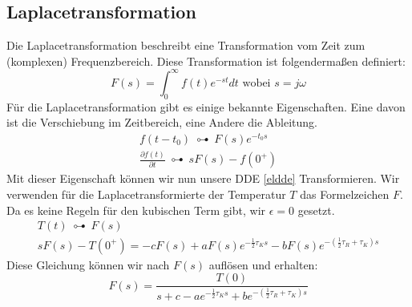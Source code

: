 \subsection{Laplacetransformation}
Die Laplacetransformation beschreibt eine Transformation vom Zeit zum (komplexen) Frequenzbereich.
Diese Transformation ist folgendermaßen definiert:
\begin{equation}
	F(s)=\int_{0}^{\infty}f(t)e^{-st}dt \text{ wobei } s=j\omega
\end{equation} 
Für die Laplacetransformation gibt es einige bekannte Eigenschaften. 
Eine davon ist die Verschiebung im Zeitbereich, eine Andere die Ableitung.
\begin{align}
	f(t-t_0)\: \multimapdotbothA \: F(s)e^{-t_0 s}\\
	\frac{\partial f(t)}{\partial t}\: \multimapdotbothA \: sF(s)-f(0^+)
\end{align}
Mit dieser Eigenschaft können wir nun unsere DDE \ref{eldde} Transformieren.
Wir verwenden für die Laplacetransformierte der Temperatur $T$ das Formelzeichen $F$.
Da es keine Regeln für den kubischen Term gibt, wir $\epsilon = 0$ gesetzt.
\begin{align}
	T(t)\: \multimapdotbothA \: F(s)\\
	sF(s)-T(0^+)=-cF(s)+aF(s)e^{-\frac{1}{2}\tau_K s}-bF(s)e^{-(\frac{1}{2}\tau_R + \tau_K) s}
\end{align}
Diese Gleichung können wir nach $F(s)$ auflösen und erhalten:
\begin{equation}
	F(s) = \frac{T(0)}{s+c-ae^{-\frac{1}{2}\tau_K s}+be^{-(\frac{1}{2}\tau_R + \tau_K)s}}
\end{equation}
